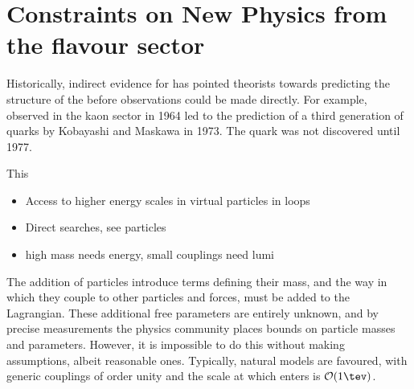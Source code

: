 \section{Constraints on New Physics from the flavour sector}

Historically, indirect evidence for \np has pointed theorists towards predicting the structure of
the \sm before observations could be made directly.
For example, \cpv observed in the kaon sector in 1964 led to the prediction of a third generation of
quarks by Kobayashi and Maskawa in 1973.
The \bquark quark was not discovered until 1977.

This

\begin{itemize}
  \item Access to higher energy scales in virtual particles in loops
  \item Direct searches, see particles
  \item high mass needs energy, small couplings need lumi
\end{itemize}





The addition of \np particles introduce terms defining their mass, and the way in which they couple
to other particles and forces, must be added to the Lagrangian.
These additional free parameters are entirely unknown, and by precise measurements the physics
community places bounds on \np particle masses and parameters.
However, it is impossible to do this without making assumptions, albeit reasonable ones.
Typically, natural models are favoured, with generic couplings of order unity and the
scale at which \np enters is $\mathcal{O}(1\tev)$.

